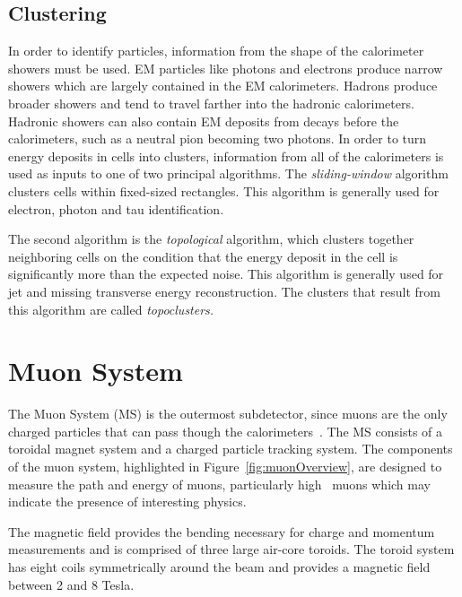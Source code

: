 \subsection{Clustering}
\label{ss:cluster}
In order to identify particles, information from the shape of the calorimeter showers must be used. EM particles like photons and electrons produce narrow showers which are largely contained in the EM calorimeters. Hadrons produce broader showers and tend to travel farther into the hadronic calorimeters. Hadronic showers can also contain EM deposits from decays before the calorimeters, such as a neutral pion becoming two photons. In order to turn energy deposits in cells into clusters, information from all of the calorimeters is used as inputs to one of two principal algorithms\cite{ATL-LARG-PUB-2008-002}. The \emph{sliding-window} algorithm clusters cells within fixed-sized rectangles. This algorithm is generally used for electron, photon and tau identification. 

The second algorithm is the \emph{topological} algorithm, which clusters together neighboring cells on the condition that the energy deposit in the cell is significantly more than the expected noise. This algorithm is generally used for jet and missing transverse energy reconstruction. The clusters that result from this algorithm are called \emph{topoclusters.}


\section{Muon System}
The Muon System (MS) is the outermost subdetector, since muons are the only charged particles that can pass though the calorimeters~\cite{2010.muonspectrometer}. The MS consists of a toroidal magnet system and a charged particle tracking system. The components of the muon system, highlighted in Figure~\ref{fig:muonOverview}, are designed to measure the path and energy of muons, particularly high \pt\ muons which may indicate the presence of interesting physics.

The magnetic field provides the bending necessary for charge and momentum measurements and is comprised of three large air-core toroids. The toroid system has eight coils symmetrically around the beam and provides a magnetic field between 2 and 8 Tesla. 

